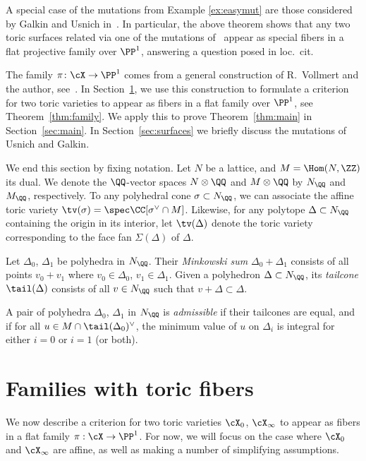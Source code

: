 A special case of the mutations from Example \ref{ex:easymut} are those considered by Galkin and Usnich in~\cite{galkin}. In particular, the above theorem shows that any two toric surfaces related via one of the mutations of~\cite{galkin} appear as special f\/ibers in a f\/lat projective family over $\PP^1$, answering a question posed in loc.~cit.

The family $\pi\colon \cX\to\PP^1$  comes from a general construction of R.~Vollmert and the author, see~\cite{ilten:09b}. In Section~\ref{sec:fam}, we use this construction to formulate a criterion for two toric varieties to appear as f\/ibers in a f\/lat family over $\PP^1$, see Theorem~\ref{thm:family}.
We apply this to prove Theorem~\ref{thm:main} in Section~\ref{sec:main}. In Section~\ref{sec:surfaces} we brief\/ly discuss the mutations of Usnich and Galkin.


We end this section by f\/ixing notation. Let $N$ be a lattice, and $M=\Hom(N,\ZZ)$ its dual. We denote the $\QQ$-vector spaces $N\otimes \QQ$ and $M\otimes \QQ$ by $N_\QQ$ and $M_\QQ$, respectively. To any polyhedral cone $\sigma\subset N_\QQ$, we can associate the af\/f\/ine toric variety $\tv(\sigma)=\spec \CC[\sigma^\vee\cap M]$. Likewise, for any polytope $\Delta\subset N_\QQ$ containing the origin in its interior, let $\tv(\Delta)$ denote the toric variety corresponding to the face fan $\Sigma(\Delta)$ of $\Delta$.

Let $\Delta_0$, $\Delta_1$ be polyhedra in $N_\QQ$. Their \emph{Minkowski sum} $\Delta_0+\Delta_1$ consists of all points $v_0+v_1$ where $v_0\in\Delta_0$, $v_1\in\Delta_1$. Given a polyhedron $\Delta\subset N_\QQ$, its \emph{tailcone} $\tail(\Delta)$ consists of all $v\in N_\QQ$ such that $v+\Delta\subset \Delta$.

\begin{Definition}
A pair of polyhedra $\Delta_0$, $\Delta_1$ in $N_\QQ$ is \emph{admissible} if their tailcones are equal, and if for all $u\in M\cap\tail(\Delta_0)^\vee$, the  minimum value of $u$ on $\Delta_i$ is integral for either $i=0$ or $i=1$ (or both).
\end{Definition}


\section{Families with toric f\/ibers}\label{sec:fam}

We now describe a criterion for two toric varieties $\cX_0$, $\cX_\infty$ to appear as f\/ibers in
a f\/lat family $\pi:\cX\to\PP^1$. For now, we will focus on the case where $\cX_0$ and $\cX_\infty$ are af\/f\/ine, as well as making a number of simplifying assumptions.

